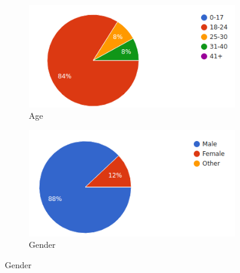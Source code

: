 \begin{figure}[ht]
  \centering
  \begin{subfigure}[b]{0.45\textwidth}
    \includegraphics[width=\textwidth]{figures/stats/age.png}
    \caption{Age}
    \label{fig:age}
  \end{subfigure}
  \quad
  \begin{subfigure}[b]{0.45\textwidth}
\label{fig:gender}
    \includegraphics[width=\textwidth]{figures/stats/gender.png}
    \caption{Gender}
  \end{subfigure}


\end{figure}
